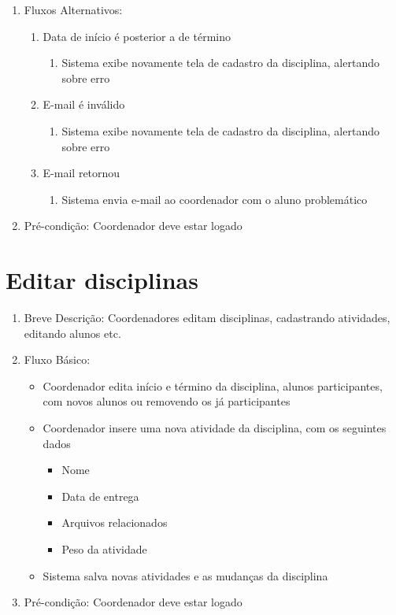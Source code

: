\begin{enumerate}
\begin{itemize}
        \end{itemize}
    \item Fluxos Alternativos:
    \begin{enumerate}
        \item Data de início é posterior a de término
        \begin{enumerate}
            \item Sistema exibe novamente tela de cadastro da disciplina, alertando sobre erro
        \end{enumerate}
        \item E-mail é inválido
        \begin{enumerate}
            \item Sistema exibe novamente tela de cadastro da disciplina, alertando sobre erro
        \end{enumerate}
        \item E-mail retornou
        \begin{enumerate}
            \item Sistema envia e-mail ao coordenador com o aluno problemático
        \end{enumerate}
    \end{enumerate}
    \item Pré-condição: Coordenador deve estar logado
\end{enumerate}

\section{Editar disciplinas}
\begin{enumerate}
    \item Breve Descrição: Coordenadores editam disciplinas, cadastrando atividades, editando alunos etc.
    \item Fluxo Básico:
        \begin{itemize}
            \item Coordenador edita início e término da disciplina, alunos participantes, com novos alunos ou removendo os já participantes
            \item Coordenador insere uma nova atividade da disciplina, com os seguintes dados
            \begin{itemize}
                \item Nome
                \item Data de entrega
                \item Arquivos relacionados
                \item Peso da atividade
            \end{itemize}
            \item Sistema salva novas atividades e as mudanças da disciplina
        \end{itemize}
    \item Pré-condição: Coordenador deve estar logado
\end{enumerate}

